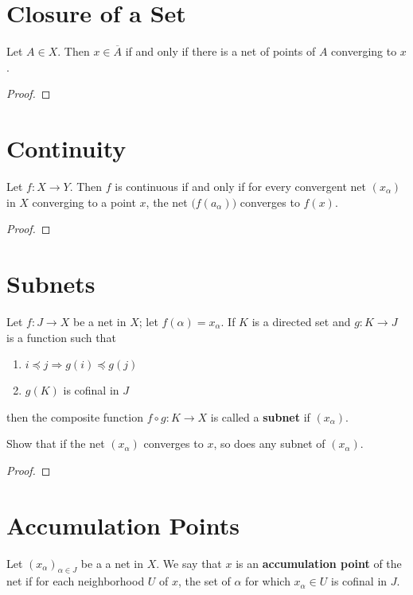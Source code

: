 \documentclass[12pt]{article}
\begin{document}
\section{Closure of a Set}
\begin{thm}
    Let $A \in X$. Then $x \in
        \overline A$ if and only if there is a net of points of $A$ converging to $x$.
\end{thm}
\begin{proof}
\end{proof}

\section{Continuity}
\begin{thm}
    Let $f: X \to Y$. Then $f$ is continuous if and only if for every convergent net $(x_\alpha)$
    in $X$ converging to a point $x$, the net $\big(f(a_\alpha)\big)$ converges to $f(x)$.
\end{thm}
\begin{proof}
\end{proof}

\section{Subnets}
\begin{defn}
    Let $f: J \to X$ be a net in $X$; let $f(\alpha) = x_\alpha$. If $K$ is a directed set and $g:
        K \to J$ is a function such that
    \begin{enumerate}
        \item $i \preceq j \Rightarrow g(i) \preceq g(j)$
        \item $g(K)$ is cofinal in $J$
    \end{enumerate}
    then the composite function $f \circ g : K \to X$ is called a \textbf{subnet} if $(x_\alpha)$.
\end{defn}

Show that if the net $(x_\alpha)$ converges to $x$, so does any subnet of $(x_\alpha)$.
\begin{proof}
\end{proof}

\section{Accumulation Points}
\begin{defn}
    Let ${(x_\alpha)}_{\alpha\in J}$ be a a net in $X$. We say that $x$ is an \textbf{accumulation
        point} of the net if for each neighborhood $U$ of $x$, the set of $\alpha$ for which
    $x_\alpha \in U$ is cofinal in $J$.
\end{defn}
\end{document}
